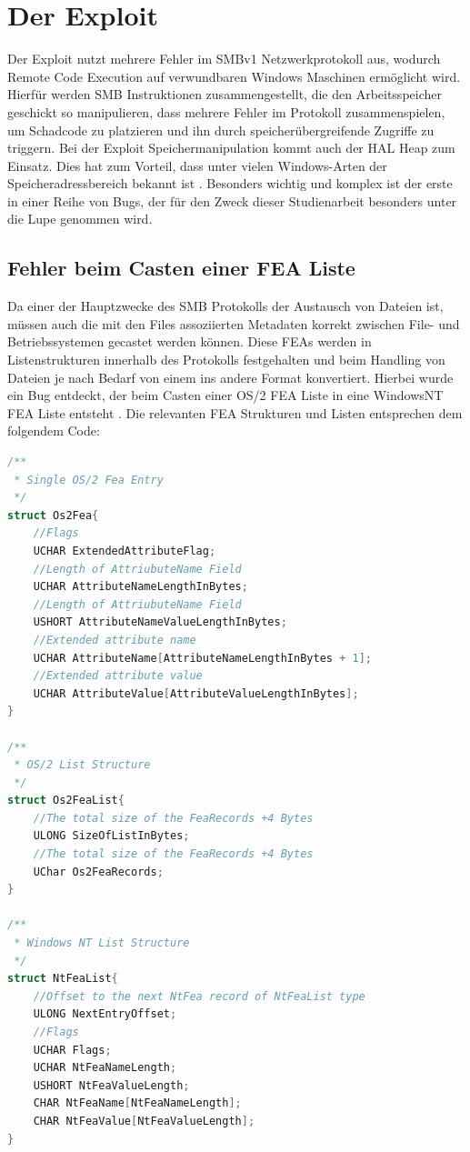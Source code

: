 \documentclass[DIV=12,headings=normal,pdftex,headinclude=false,footinclude=false,final]{scrreprt}
\begin{document}
\chapter{Der Exploit}
Der Exploit nutzt mehrere Fehler im SMBv1 Netzwerkprotokoll aus, wodurch Remote Code Execution auf verwundbaren Windows Maschinen ermöglicht wird.\\ Hierfür werden SMB Instruktionen zusammengestellt, die den Arbeitsspeicher geschickt so manipulieren, dass mehrere Fehler im Protokoll zusammenspielen, um Schadcode zu platzieren und ihn durch speicherübergreifende Zugriffe zu triggern\cite{Medium}. Bei der Exploit Speichermanipulation kommt auch der HAL Heap zum Einsatz. Dies hat zum Vorteil, dass unter vielen Windows-Arten der Speicheradressbereich bekannt ist \cite{GH:FEA}. Besonders wichtig und komplex ist der erste in einer Reihe von Bugs, der für den Zweck dieser Studienarbeit besonders unter die Lupe genommen wird.

\section{Fehler beim Casten einer FEA Liste}
Da einer der Hauptzwecke des SMB Protokolls der Austausch von Dateien ist, müssen auch die mit den Files assoziierten Metadaten korrekt zwischen File- und Betriebssystemen gecastet werden können. Diese FEAs werden in Listenstrukturen innerhalb des Protokolls festgehalten und beim Handling von Dateien je nach Bedarf von einem ins andere Format konvertiert. Hierbei wurde ein Bug entdeckt, der beim Casten einer OS/2 FEA Liste in eine WindowsNT FEA Liste entsteht \cite{TM:EB}. Die relevanten FEA Strukturen und Listen entsprechen dem folgendem Code:\\

\begin{lstlisting}[language=C,caption={Die zwei relevanten FEAs und exemplarisch die NTFEA-Liste\cite{CP}},captionpos=b]
/**
 * Single OS/2 Fea Entry
 */
struct Os2Fea{
    //Flags
    UCHAR ExtendedAttributeFlag;
    //Length of AttriubuteName Field
    UCHAR AttributeNameLengthInBytes;
    //Length of AttriubuteName Field
    USHORT AttributeNameValueLengthInBytes;
    //Extended attribute name
    UCHAR AttributeName[AttributeNameLengthInBytes + 1];
    //Extended attribute value
    UCHAR AttributeValue[AttributeValueLengthInBytes]; 
}
 
/**
 * OS/2 List Structure
 */
struct Os2FeaList{
    //The total size of the FeaRecords +4 Bytes
    ULONG SizeOfListInBytes; 
    //The total size of the FeaRecords +4 Bytes
    UChar Os2FeaRecords;
}
 
/**
 * Windows NT List Structure
 */
struct NtFeaList{
    //Offset to the next NtFea record of NtFeaList type
    ULONG NextEntryOffset;
    //Flags
    UCHAR Flags;
    UCHAR NtFeaNameLength;
    USHORT NtFeaValueLength;
    CHAR NtFeaName[NtFeaNameLength];
    CHAR NtFeaValue[NtFeaValueLength];
}
\end{lstlisting}
\end{document}
